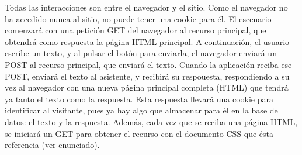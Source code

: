 Todas las interacciones son entre el navegador y el sitio. Como el navegador no ha accedido nunca al sitio, no puede tener una cookie para él. El escenario comenzará con una petición GET del navegador al recurso principal, que obtendrá como respuesta la página HTML principal. A continuación, el usuario escribe un texto, y al pulsar el botón para enviarla, el navegador enviará un POST al recurso principal, que enviará el texto. Cuando la aplicación reciba ese POST, enviará el texto al asistente, y recibirá su respouesta, respondiendo a su vez al navegador con una nueva página principal completa (HTML) que tendrá ya tanto el texto como la respuesta. Esta respuesta llevará una cookie para identificar al visitante, pues ya hay algo que almacenar para él en la base de datos: el texto y la respuesta. Además, cada vez que se reciba una página HTML, se iniciará un GET para obtener el recurso con el documento CSS que ésta referencia (ver enunciado).
